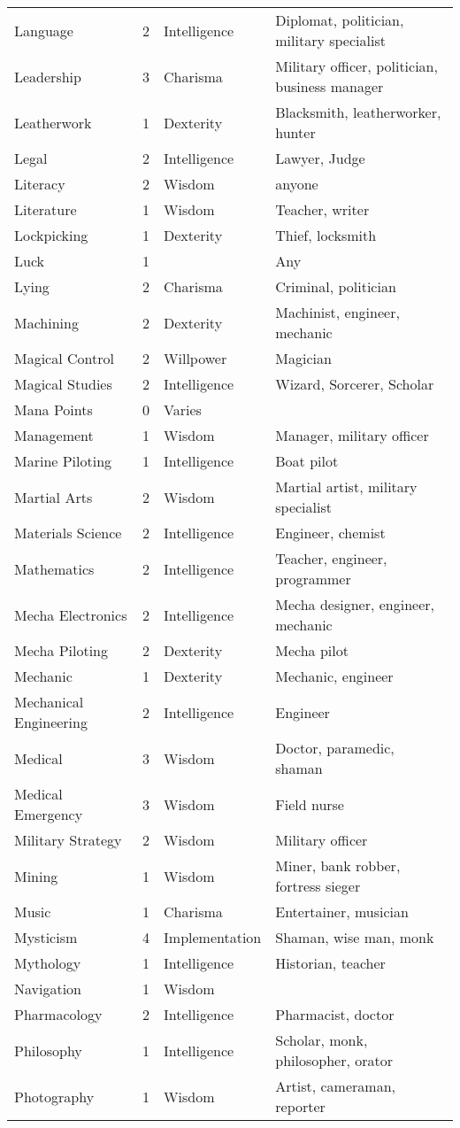 \documentclass[twoside]{book}
\begin{document}
\begin{longtable}{p{1.25in}llp{12em}}
      \raggedright Language&2&Intelligence&Diplomat, politician, military specialist\tabularnewline
      \raggedright Leadership&3&Charisma&Military officer, politician, business manager\tabularnewline
      \raggedright Leatherwork&1&Dexterity&Blacksmith, leatherworker, hunter\tabularnewline
      \raggedright Legal&2&Intelligence&Lawyer, Judge\tabularnewline
      \raggedright Literacy&2&Wisdom&anyone\tabularnewline
      \raggedright Literature&1&Wisdom&Teacher, writer\tabularnewline
      \raggedright Lockpicking&1&Dexterity&Thief, locksmith\tabularnewline
      \raggedright Luck&1&&Any\tabularnewline
      \raggedright Lying&2&Charisma&Criminal, politician\tabularnewline
      \raggedright Machining&2&Dexterity&Machinist, engineer, mechanic\tabularnewline
      \raggedright Magical Control&2&Willpower&Magician\tabularnewline
      \raggedright Magical Studies&2&Intelligence&Wizard, Sorcerer, Scholar\tabularnewline
      \raggedright Mana Points&0&Varies&\tabularnewline
      \raggedright Management&1&Wisdom&Manager, military officer\tabularnewline
      \raggedright Marine Piloting&1&Intelligence&Boat pilot\tabularnewline
      \raggedright Martial Arts&2&Wisdom&Martial artist, military specialist\tabularnewline
      \raggedright Materials Science&2&Intelligence&Engineer, chemist\tabularnewline
      \raggedright Mathematics&2&Intelligence&Teacher, engineer, programmer\tabularnewline
      \raggedright Mecha Electronics&2&Intelligence&Mecha designer, engineer, mechanic\tabularnewline
      \raggedright Mecha Piloting&2&Dexterity&Mecha pilot\tabularnewline
      \raggedright Mechanic&1&Dexterity&Mechanic, engineer\tabularnewline
      \raggedright Mechanical Engineering&2&Intelligence&Engineer\tabularnewline
      \raggedright Medical&3&Wisdom&Doctor, paramedic, shaman\tabularnewline
      \raggedright Medical Emergency&3&Wisdom&Field nurse\tabularnewline
      \raggedright Military Strategy&2&Wisdom&Military officer\tabularnewline
      \raggedright Mining&1&Wisdom&Miner, bank robber, fortress sieger\tabularnewline
      \raggedright Music&1&Charisma&Entertainer, musician\tabularnewline
      \raggedright Mysticism&4&Implementation&Shaman, wise man, monk\tabularnewline
      \raggedright Mythology&1&Intelligence&Historian, teacher\tabularnewline
      \raggedright Navigation&1&Wisdom\tabularnewline
      \raggedright Pharmacology&2&Intelligence&Pharmacist, doctor\tabularnewline
      \raggedright Philosophy&1&Intelligence&Scholar, monk, philosopher, orator\tabularnewline
      \raggedright Photography&1&Wisdom&Artist, cameraman, reporter\tabularnewline

\end{longtable}
\end{document}
